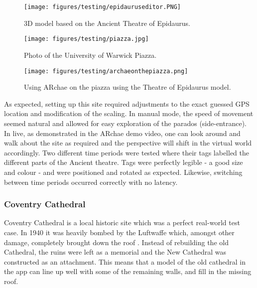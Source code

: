 \documentclass[12pt, a4paper]{article}
\begin{document}
\vspace{0.5cm}

\begin{figure}[h]
\begin{minipage}{.48\textwidth}
    \centering
  \texttt{[image: figures/testing/epidauruseditor.PNG]}
  \caption{3D model based on the Ancient Theatre of Epidaurus.}
  \label{fig:epidaurus}
\end{minipage}
\begin{minipage}{.04\textwidth}
  \hspace{0.1cm}
\end{minipage}
\begin{minipage}{.48\textwidth}
    \centering
  \texttt{[image: figures/testing/piazza.jpg]}
  \caption{Photo of the University of Warwick Piazza.}
  \label{fig:piazza}
\end{minipage}
\end{figure}

\begin{figure}[h]
\centering
    \texttt{[image: figures/testing/archaeonthepiazza.png]}
        \caption{Using ARchae on the piazza using the Theatre of Epidaurus model.}
        \label{fig:piazzalive}
\end{figure}

As expected, setting up this site required adjustments to the exact guessed GPS location and modification of the scaling. In manual mode, the speed of movement seemed natural and allowed for easy exploration of the parados (side-entrance). In live, as demonstrated in the ARchae demo video, one can look around and walk about the site as required and the perspective will shift in the virtual world accordingly. Two different time periods were tested where their tags labelled the different parts of the Ancient theatre. Tags were perfectly legible - a good size and colour - and were positioned and rotated as expected. Likewise, switching between time periods occurred correctly with no latency.

\subsubsection{Coventry Cathedral}
Coventry Cathedral is a local historic site which was a perfect real-world test case. In 1940 it was heavily bombed by the Luftwaffe which, amongst other damage, completely brought down the roof \cite{testing:covhistory}. Instead of rebuilding the old Cathedral, the ruins were left as a memorial and the New Cathedral was constructed as an attachment. This means that a model of the old cathedral in the app can line up well with some of the remaining walls, and fill in the missing roof. 
\end{document}

